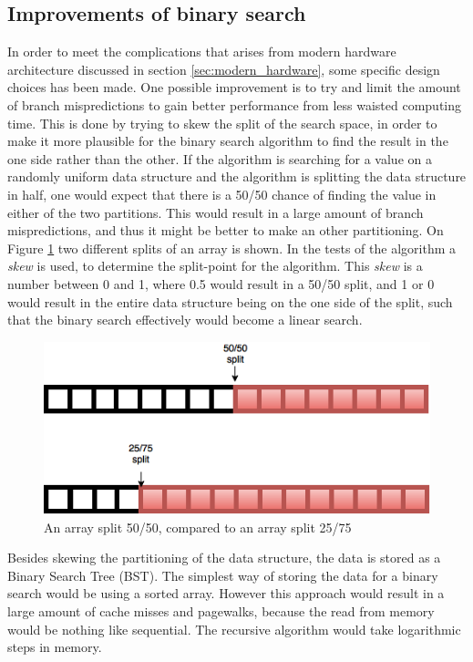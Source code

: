 \documentclass{article}
\begin{document}
\subsection{Improvements of binary search}
\label{sec:improvements}
In order to meet the complications that arises from modern hardware architecture discussed in section \ref{sec:modern_hardware}, some specific design choices has been made. One possible improvement is to try and limit the amount of branch mispredictions to gain better performance from less waisted computing time. This is done by trying to skew the split of the search space, in order to make it more plausible for the binary search algorithm to find the result in the one side rather than the other. If the algorithm is searching for a value on a randomly uniform data structure and the algorithm is splitting the data structure in half, one would expect that there is a 50/50 chance of finding the value in either of the two partitions. This would result in a large amount of branch mispredictions, and thus it might be better to make an other partitioning. On Figure \ref{fig:array_split} two different splits of an array is shown. In the tests of the algorithm a \textit{skew} is used, to determine the split-point for the algorithm. This \textit{skew} is a number between 0 and 1, where 0.5 would result in a 50/50 split, and 1 or 0 would result in the entire data structure being on the one side of the split, such that the binary search effectively would become a linear search.

\begin{figure}[H]
  \includegraphics[width=\textwidth]{figures/Array_eq_split}
  \caption{An array split 50/50, compared to an array split 25/75}
  \label{fig:array_split}
\end{figure}

Besides skewing the partitioning of the data structure, the data is stored as a Binary Search Tree (BST)\cite[p.~286]{CLRS}. The simplest way of storing the data for a binary search would be using a sorted array. However this approach would result in a large amount of cache misses and pagewalks, because the read from memory would be nothing like sequential. The recursive algorithm would take logarithmic steps in memory. 
\end{document}
